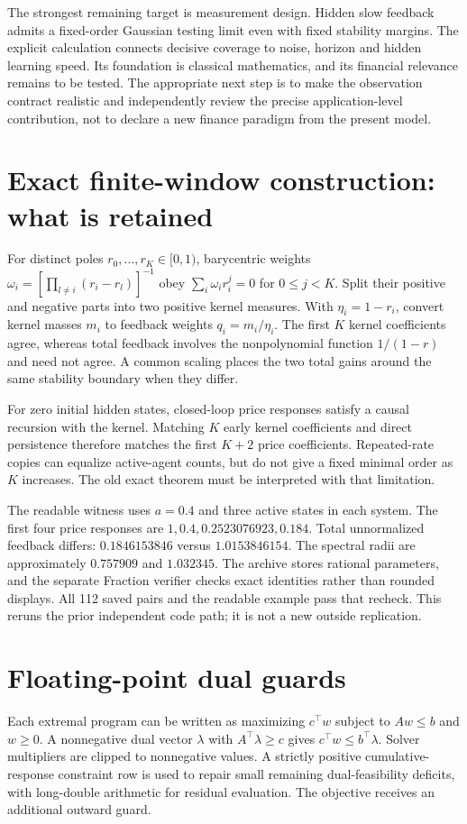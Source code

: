 \documentclass[11pt]{article}
\theoremstyle{remark}\newtheorem{remark}[proposition]{Remark}
\begin{document}
The strongest remaining target is measurement design. Hidden slow feedback admits a fixed-order Gaussian testing limit even with fixed stability margins. The explicit calculation connects decisive coverage to noise, horizon and hidden learning speed. Its foundation is classical mathematics, and its financial relevance remains to be tested. The appropriate next step is to make the observation contract realistic and independently review the precise application-level contribution, not to declare a new finance paradigm from the present model.

\appendix
\section{Exact finite-window construction: what is retained}
For distinct poles $r_0,\ldots,r_K\in[0,1)$, barycentric weights
$\omega_i=[\prod_{l\ne i}(r_i-r_l)]^{-1}$ obey
$\sum_i\omega_i r_i^j=0$ for $0\le j<K$. Split their positive and negative parts into two positive kernel measures. With $\eta_i=1-r_i$, convert kernel masses $m_i$ to feedback weights $q_i=m_i/\eta_i$. The first $K$ kernel coefficients agree, whereas total feedback involves the nonpolynomial function $1/(1-r)$ and need not agree. A common scaling places the two total gains around the same stability boundary when they differ.

For zero initial hidden states, closed-loop price responses satisfy a causal recursion with the kernel. Matching $K$ early kernel coefficients and direct persistence therefore matches the first $K+2$ price coefficients. Repeated-rate copies can equalize active-agent counts, but do not give a fixed minimal order as $K$ increases. The old exact theorem must be interpreted with that limitation.

The readable witness uses $a=0.4$ and three active states in each system. The first four price responses are $1,0.4,0.2523076923,0.184$. Total unnormalized feedback differs: $0.1846153846$ versus $1.0153846154$. The spectral radii are approximately $0.757909$ and $1.032345$. The archive stores rational parameters, and the separate Fraction verifier checks exact identities rather than rounded displays. All 112 saved pairs and the readable example pass that recheck. This reruns the prior independent code path; it is not a new outside replication.

\section{Floating-point dual guards}
Each extremal program can be written as maximizing $c^\top w$ subject to $Aw\le b$ and $w\ge0$. A nonnegative dual vector $\lambda$ with $A^\top\lambda\ge c$ gives $c^\top w\le b^\top\lambda$. Solver multipliers are clipped to nonnegative values. A strictly positive cumulative-response constraint row is used to repair small remaining dual-feasibility deficits, with long-double arithmetic for residual evaluation. The objective receives an additional outward guard.
\end{document}
